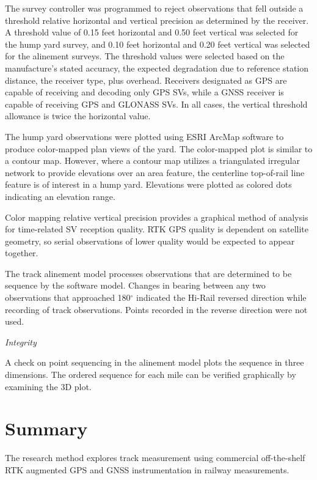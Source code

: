 The survey controller was programmed to reject observations that fell outside a threshold relative horizontal and vertical precision as determined by the receiver. A threshold value of 0.15 feet horizontal and 0.50 feet vertical was selected for the hump yard survey, and 0.10 feet horizontal and 0.20 feet vertical was selected for the alinement surveys. The threshold values were selected based on the manufacture's stated accuracy, the expected degradation due to reference station distance, the  receiver type, plus overhead. Receivers designated as GPS are capable of receiving and decoding only GPS SVs, while a GNSS receiver is capable of receiving GPS and GLONASS SVs. In all cases, the vertical threshold allowance is twice the horizontal value.

The hump yard observations were plotted using ESRI ArcMap software to produce color-mapped plan views of the yard. The color-mapped plot is similar to a contour map. However, where a contour map utilizes a triangulated irregular network to provide elevations over an area feature, the centerline top-of-rail line feature is of interest in a hump yard. Elevations were plotted as colored dots indicating an elevation range.

Color mapping relative vertical precision provides a graphical method of analysis for time-related SV reception quality. RTK GPS quality is dependent on satellite geometry, so serial observations of lower quality would be expected to appear together.

The track alinement model processes observations that are determined to be sequence by the software model. Changes in bearing between any two observations that approached 180$^{\circ}$ indicated the Hi-Rail reversed direction while recording of track observations. Points recorded in the reverse direction were not used.

\emph{Integrity}

A check on point sequencing in the alinement model plots the sequence in three dimensions. The ordered sequence for each mile can be verified graphically by examining the 3D plot.

\section{Summary}
The research method explores track measurement using commercial off-the-shelf RTK augmented GPS and GNSS instrumentation in railway measurements. 

